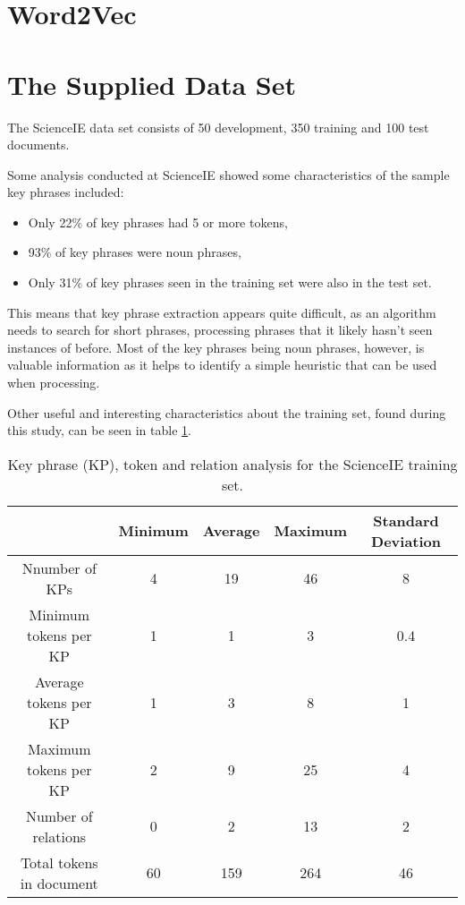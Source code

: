 \section{Word2Vec}

\section{The Supplied Data Set}
The ScienceIE data set consists of 50 development, 350 training and 100 test documents. 

Some analysis conducted at ScienceIE \cite{Augenstein2017} showed some characteristics of the sample key phrases included:
\begin{itemize}
	\item Only 22\% of key phrases had 5 or more tokens,
	\item 93\% of key phrases were noun phrases,
	\item Only 31\% of key phrases seen in the training set were also in the test set.
\end{itemize}

This means that key phrase extraction appears quite difficult, as an algorithm needs to search for short phrases, processing phrases that it likely hasn't seen instances of before. Most of the key phrases being noun phrases, however, is valuable information as it helps to identify a simple heuristic that can be used when processing.

Other useful and interesting characteristics about the training set, found during this study, can be seen in table \ref{table:traininganalysis}. 

\begin{table}
	\centering
	\begin{tabular}{ c | c c c c }
		& \textbf{Minimum} & \textbf{Average} & \textbf{Maximum} & \textbf{Standard Deviation} \\
		\hline
		Nnumber of KPs & 4 & 19 & 46 & 8 \\
		Minimum tokens per KP & 1 & 1 & 3 & 0.4 \\
		Average tokens per KP & 1 & 3 & 8 & 1 \\
		Maximum tokens per KP & 2 & 9 & 25 & 4 \\
		Number of relations & 0 & 2 & 13 & 2 \\
		Total tokens in document & 60 & 159 & 264 & 46
	\end{tabular}
	\caption[ScienceIE Training Set Analysis]{Key phrase (KP), token and relation analysis for the ScienceIE training set.}
	\label{table:traininganalysis}
\end{table}

